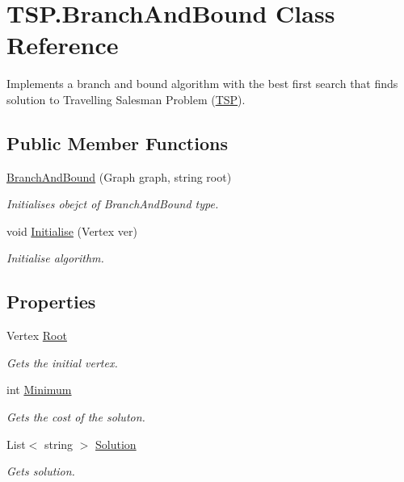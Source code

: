 \hypertarget{class_t_s_p_1_1_branch_and_bound}{}\section{T\+S\+P.\+Branch\+And\+Bound Class Reference}
\label{class_t_s_p_1_1_branch_and_bound}


Implements a branch and bound algorithm with the best first search that finds solution to Travelling Salesman Problem (\hyperlink{namespace_t_s_p}{T\+SP}).  


\subsection*{Public Member Functions}
\begin{DoxyCompactItemize}
\item 
\hyperlink{class_t_s_p_1_1_branch_and_bound_a84b9a838cc94e09944800997fc8e9603}{Branch\+And\+Bound} (Graph graph, string root)
\begin{DoxyCompactList}\small\item\em Initialises obejct of {\itshape Branch\+And\+Bound}  type. \end{DoxyCompactList}\item 
void \hyperlink{class_t_s_p_1_1_branch_and_bound_a481cf0409bad1731787b1bf60b2186b6}{Initialise} (Vertex ver)
\begin{DoxyCompactList}\small\item\em Initialise algorithm. \end{DoxyCompactList}\end{DoxyCompactItemize}
\subsection*{Properties}
\begin{DoxyCompactItemize}
\item 
Vertex \hyperlink{class_t_s_p_1_1_branch_and_bound_a6cfacf2e18f7380bd6b0d590a4e4beba}{Root}
\begin{DoxyCompactList}\small\item\em Gets the initial vertex. \end{DoxyCompactList}\item 
int \hyperlink{class_t_s_p_1_1_branch_and_bound_abf0f798bc9d1fbcc337d430665cea9d5}{Minimum}
\begin{DoxyCompactList}\small\item\em Gets the cost of the soluton. \end{DoxyCompactList}\item 
List$<$ string $>$ \hyperlink{class_t_s_p_1_1_branch_and_bound_a09726f63fe30fb54455b1b1f7b05d2d9}{Solution}
\begin{DoxyCompactList}\small\item\em Gets solution. \end{DoxyCompactList}\end{DoxyCompactItemize}


